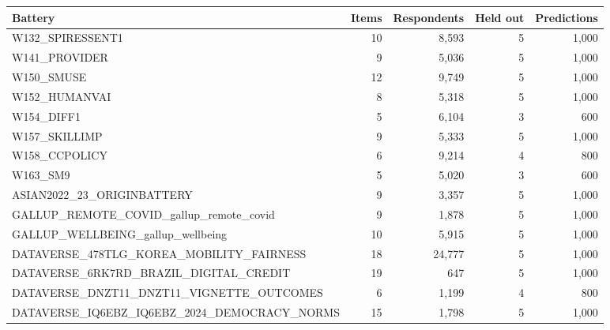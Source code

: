\begin{tabular}{lrrrr}\toprule
Battery & Items & Respondents & Held out & Predictions \\
\midrule
W132\_SPIRESSENT1 & 10 & 8,593 & 5 & 1,000 \\
W141\_PROVIDER & 9 & 5,036 & 5 & 1,000 \\
W150\_SMUSE & 12 & 9,749 & 5 & 1,000 \\
W152\_HUMANVAI & 8 & 5,318 & 5 & 1,000 \\
W154\_DIFF1 & 5 & 6,104 & 3 & 600 \\
W157\_SKILLIMP & 9 & 5,333 & 5 & 1,000 \\
W158\_CCPOLICY & 6 & 9,214 & 4 & 800 \\
W163\_SM9 & 5 & 5,020 & 3 & 600 \\
ASIAN2022\_23\_ORIGINBATTERY & 9 & 3,357 & 5 & 1,000 \\
GALLUP\_REMOTE\_COVID\_gallup\_remote\_covid & 9 & 1,878 & 5 & 1,000 \\
GALLUP\_WELLBEING\_gallup\_wellbeing & 10 & 5,915 & 5 & 1,000 \\
DATAVERSE\_478TLG\_KOREA\_MOBILITY\_FAIRNESS & 18 & 24,777 & 5 & 1,000 \\
DATAVERSE\_6RK7RD\_BRAZIL\_DIGITAL\_CREDIT & 19 & 647 & 5 & 1,000 \\
DATAVERSE\_DNZT11\_DNZT11\_VIGNETTE\_OUTCOMES & 6 & 1,199 & 4 & 800 \\
DATAVERSE\_IQ6EBZ\_IQ6EBZ\_2024\_DEMOCRACY\_NORMS & 15 & 1,798 & 5 & 1,000 \\
\bottomrule\end{tabular}
